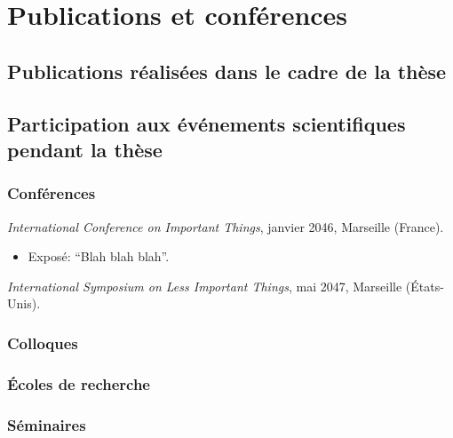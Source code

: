 \chapter*{Publications et conférences}

\section*{Publications réalisées dans le cadre de la thèse}



\section*{Participation aux événements scientifiques pendant la thèse}

\newcommand{\conftitle}[1]{\emph{#1}}
\newenvironment{exposes}{\vspace{-0.5\parskip}\begin{itemize}}{\end{itemize}}

\subsection*{Conférences}

\conftitle{International Conference on Important Things},
janvier 2046, Marseille (France).
\begin{exposes}
\item Exposé: \enquote{Blah blah blah}.
\end{exposes}

\conftitle{International Symposium on Less Important Things},
mai 2047, Marseille (États-Unis).

\subsection*{Colloques}

\subsection*{Écoles de recherche}

\subsection*{Séminaires}
